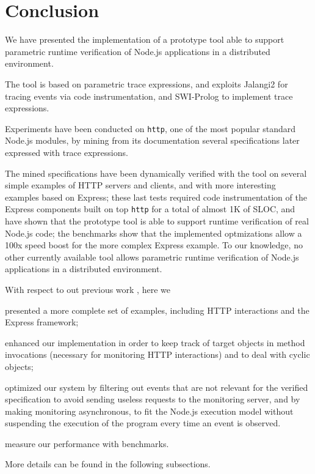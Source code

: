 \section{Conclusion}
\label{sec:conclu}

We have presented the implementation of a prototype tool able to support
parametric runtime verification of Node.js applications in a distributed environment.

The tool is based on parametric trace expressions, and exploits Jalangi2 for tracing events via code instrumentation, and SWI-Prolog to
implement trace expressions.

Experiments have been conducted on \lstinline{http}, one of the most popular standard Node.js modules,
by mining from its documentation several specifications later expressed with trace expressions.

The mined specifications have been dynamically verified with the tool on several simple examples of HTTP servers and clients,
and with more interesting examples based on Express; these last tests required code instrumentation of the Express components
built on top \lstinline{http} for a total of almost 1K of SLOC, and have shown that the prototype tool is able to support
runtime verification of real Node.js code; the benchmarks show that the implemented optmizations allow a 100x speed boost for the more
complex Express example.
To our knowledge, no other currently available tool allows parametric runtime verification of Node.js applications in a distributed environment.

With respect to out previous work \cite{TowardsIoT17}, here we
\begin{enumerate*}[label=(\alph*)]
	\item presented a more complete set of examples, including HTTP interactions and the Express framework;
	\item enhanced our implementation in order to keep track of target objects in method invocations (necessary for monitoring HTTP interactions) and to deal with cyclic objects;
	\item optimized our system by filtering out events that are not relevant for the verified specification to avoid sending useless requests to the monitoring server, and by making monitoring asynchronous, to fit the Node.js execution model without suspending the execution of the program every time an event is observed.
	\item measure our performance with benchmarks.
\end{enumerate*}
More details can be found in the following subsections.

